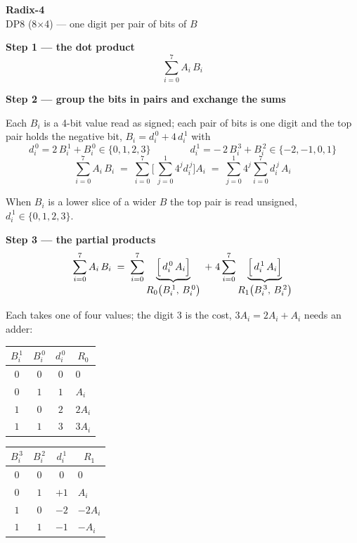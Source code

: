 \documentclass[fleqn]{article}
\newcommand{\Rl}{R_0\bigl(B_i^{\,1},\, B_i^{\,0}\bigr)}
\newcommand{\Rh}{R_1\bigl(B_i^{\,3},\, B_i^{\,2}\bigr)}
\begin{document}
\begin{center}
{\LARGE \textbf{Radix-4}}\\[4pt]
{\large DP8 (8$\times$4) --- one digit per pair of bits of $B$}
\end{center}

\vspace{1.5em}

\noindent\textbf{Step 1 --- the dot product}
\[
\sum_{i=0}^{7} A_i \, B_i
\]

\vspace{0.5em}

\noindent\textbf{Step 2 --- group the bits in pairs and exchange the sums}

\noindent Each $B_i$ is a 4-bit value read as signed; each pair of bits is one digit and
the top pair holds the negative bit, $B_i = d_i^{\,0} + 4\,d_i^{\,1}$ with
\[
d_i^{\,0} = 2\,B_i^{\,1} + B_i^{\,0} \in \{0, 1, 2, 3\}
\qquad\qquad
d_i^{\,1} = -\,2\,B_i^{\,3} + B_i^{\,2} \in \{-2, -1, 0, 1\}
\]
\[
\sum_{i=0}^{7} A_i \, B_i
  \;=\; \sum_{i=0}^{7} \Biggl[\, \sum_{j=0}^{1} 4^{j} d_i^{\,j} \Biggr] A_i
  \;=\; \sum_{j=0}^{1} 4^{j} \sum_{i=0}^{7} d_i^{\,j} \, A_i
\]

\noindent When $B_i$ is a lower slice of a wider $B$ the top pair is read unsigned,
$d_i^{\,1} \in \{0, 1, 2, 3\}$.

\vspace{0.5em}

\noindent\textbf{Step 3 --- the partial products}
\[
\sum_{i=0}^{7} A_i \, B_i
  \;=\; \sum_{i=0}^{7}
        \underbrace{\Bigl[\, d_i^{\,0} \, A_i \Bigr]}_{\textstyle \Rl}
  \;+\; 4 \sum_{i=0}^{7}
        \underbrace{\Bigl[\, d_i^{\,1} \, A_i \Bigr]}_{\textstyle \Rh}
\]

\noindent Each takes one of four values; the digit $3$ is the cost, $3A_i = 2A_i + A_i$
needs an adder:

\vspace{0.5em}

\begin{center}
\renewcommand{\arraystretch}{1.2}
\begin{tabular}{c c | c | l}
$B_i^{\,1}$ & $B_i^{\,0}$ & $d_i^{\,0}$ & \multicolumn{1}{c}{$R_0$} \\
\hline
$0$ & $0$ & $0$ & $0$ \\
$0$ & $1$ & $1$ & $A_i$ \\
$1$ & $0$ & $2$ & $2A_i$ \\
$1$ & $1$ & $3$ & $3A_i$ \\
\end{tabular}
\qquad\qquad
\begin{tabular}{c c | c | l}
$B_i^{\,3}$ & $B_i^{\,2}$ & $d_i^{\,1}$ & \multicolumn{1}{c}{$R_1$} \\
\hline
$0$ & $0$ & $0$  & $0$ \\
$0$ & $1$ & $+1$ & $A_i$ \\
$1$ & $0$ & $-2$ & $-2A_i$ \\
$1$ & $1$ & $-1$ & $-A_i$ \\
\end{tabular}
\end{center}
\end{document}
